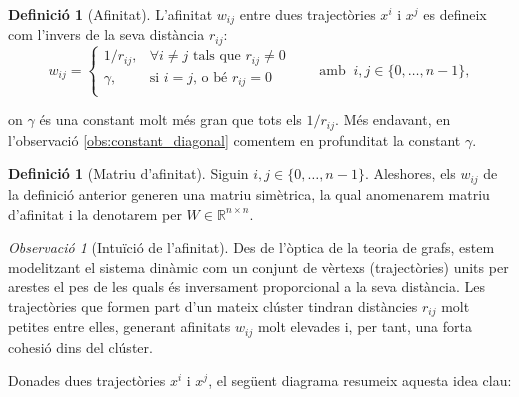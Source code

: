 \documentclass[12,twoside]{TFG-GM}
\theoremstyle{definition}
\newtheorem{definition}[theorem]{Definició}
\theoremstyle{remark}
\newtheorem{observation}[theorem]{Observació}
\newcommand{\R}{\mathbb{R}}
\begin{document}
\begin{definition}[Afinitat]
    L'afinitat $w_{ij}$ entre dues trajectòries $x^i$ i $x^j$ es defineix com l'invers de la seva distància $r_{ij}$:
\begin{equation}
    w_{ij} =
    \begin{cases}
        1/r_{ij}, & \forall i \neq j \text{ tals que } r_{ij}\neq 0\\
        \gamma%
        , & \text{si } i = j \text{, o bé } r_{ij}=0\\
    \end{cases}
    \qquad \text{amb } \ i,j\in\{0,\dots,n-1\},
\end{equation}

on $\gamma$ és una constant molt més gran que tots els $1/r_{ij}$. Més endavant, en l'observació \ref{obs:constant_diagonal} comentem en profunditat la constant $\gamma$. %
\end{definition}

\begin{definition}[Matriu d'afinitat]
     Siguin $i,j\in\{0,\dots,n-1\}$. Aleshores, els $w_{ij}$ de la definició anterior generen una matriu simètrica, la qual anomenarem matriu d'afinitat i la denotarem per $W\in\R^{n \times n}$.
\end{definition}

\begin{observation}[Intuïció de l'afinitat]
    Des de l'òptica de la teoria de grafs, estem modelitzant el sistema dinàmic com un conjunt de vèrtexs (trajectòries) units per arestes el pes de les quals és inversament proporcional a la seva distància. Les trajectòries que formen part d'un mateix clúster tindran distàncies $r_{ij}$ molt petites entre elles, generant afinitats $w_{ij}$ molt elevades i, per tant, una forta cohesió dins del clúster.
\end{observation}

Donades dues trajectòries $x^i$ i $x^j$, el següent diagrama resumeix aquesta idea clau:
\end{document}
